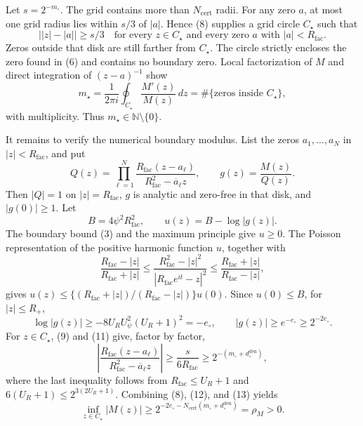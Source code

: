 Let \(s=2^{-m_\circ}\).  The grid contains more than \(N_{\mathrm{cert}}\) radii.  For any zero \(a\), at most one grid radius lies within \(s/3\) of \(|a|\).  Hence (8) supplies a grid circle \(C_\star\) such that
\[
 \bigl||z|-|a|\bigr|\ge s/3
 \quad\text{for every }z\in C_\star
 \text{ and every zero }a\text{ with }|a|<R_{\mathrm{fac}}. \tag{9}
\]
Zeros outside that disk are still farther from \(C_\star\).  The circle strictly encloses the zero found in (6) and contains no boundary zero.  Local factorization of \(M\) and direct integration of \((z-a)^{-1}\) show
\[
 m_\star=\frac1{2\pi i}\oint_{C_\star}\frac{M'(z)}{M(z)}\,dz
 =\#\{\text{zeros inside }C_\star\}, \tag{10}
\]
with multiplicity.  Thus \(m_\star\in\mathbb N\setminus\{0\}\).

It remains to verify the numerical boundary modulus.  List the zeros \(a_1,\ldots,a_N\) in \(|z|<R_{\mathrm{fac}}\), and put
\[
 Q(z)=\prod_{\ell=1}^N
 \frac{R_{\mathrm{fac}}(z-a_\ell)}{R_{\mathrm{fac}}^2-\overline a_\ell z},
 \qquad g(z)=\frac{M(z)}{Q(z)}. \tag{11}
\]
Then \(|Q|=1\) on \(|z|=R_{\mathrm{fac}}\), \(g\) is analytic and zero-free in that disk, and \(|g(0)|\ge1\).  Let
\[
 B=4\psi^2R_{\mathrm{fac}}^2,
 \qquad u(z)=B-\log|g(z)|.
\]
The boundary bound (3) and the maximum principle give \(u\ge0\).  The Poisson representation of the positive harmonic function \(u\), together with
\[
 \frac{R_{\mathrm{fac}}-|z|}{R_{\mathrm{fac}}+|z|}
 \le \frac{R_{\mathrm{fac}}^2-|z|^2}{|R_{\mathrm{fac}}e^{it}-z|^2}
 \le\frac{R_{\mathrm{fac}}+|z|}{R_{\mathrm{fac}}-|z|},
\]
gives \(u(z)\le\{(R_{\mathrm{fac}}+|z|)/(R_{\mathrm{fac}}-|z|)\}u(0)\).  Since \(u(0)\le B\), for \(|z|\le R_+\),
\[
 \log|g(z)|
 \ge-8U_RU_\psi^2(U_R+1)^2=-e_\circ,
 \qquad |g(z)|\ge e^{-e_\circ}\ge2^{-2e_\circ}. \tag{12}
\]
For \(z\in C_\star\), (9) and (11) give, factor by factor,
\[
 \left|\frac{R_{\mathrm{fac}}(z-a_\ell)}
 {R_{\mathrm{fac}}^2-\overline a_\ell z}\right|
 \ge\frac{s}{6R_{\mathrm{fac}}}
 \ge2^{-(m_\circ+d_\circ^{\mathrm{den}})}, \tag{13}
\]
where the last inequality follows from \(R_{\mathrm{fac}}\le U_R+1\) and \(6(U_R+1)\le2^{3(2U_R+1)}\).  Combining (8), (12), and (13) yields
\[
 \inf_{z\in C_\star}|M(z)|
 \ge2^{-2e_\circ-N_{\mathrm{cert}}(m_\circ+d_\circ^{\mathrm{den}})}
 =\rho_M>0. \tag{14}
\]

